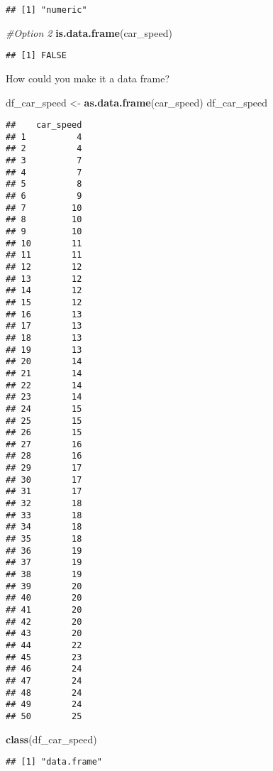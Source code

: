 \documentclass[
]{article}
\newenvironment{Shaded}{\begin{snugshade}}{\end{snugshade}}
\newcommand{\CommentTok}[1]{\textcolor[rgb]{0.56,0.35,0.01}{\textit{#1}}}
\newcommand{\KeywordTok}[1]{\textcolor[rgb]{0.13,0.29,0.53}{\textbf{#1}}}
\newcommand{\NormalTok}[1]{#1}
\newcommand{\StringTok}[1]{\textcolor[rgb]{0.31,0.60,0.02}{#1}}
\begin{document}
\begin{verbatim}
## [1] "numeric"
\end{verbatim}

\begin{Shaded}
\begin{Highlighting}[]
\CommentTok{#Option 2}
\KeywordTok{is.data.frame}\NormalTok{(car_speed)}
\end{Highlighting}
\end{Shaded}

\begin{verbatim}
## [1] FALSE
\end{verbatim}

How could you make it a data frame?

\begin{Shaded}
\begin{Highlighting}[]
\NormalTok{df_car_speed <-}\StringTok{ }\KeywordTok{as.data.frame}\NormalTok{(car_speed)}
\NormalTok{df_car_speed}
\end{Highlighting}
\end{Shaded}

\begin{verbatim}
##    car_speed
## 1          4
## 2          4
## 3          7
## 4          7
## 5          8
## 6          9
## 7         10
## 8         10
## 9         10
## 10        11
## 11        11
## 12        12
## 13        12
## 14        12
## 15        12
## 16        13
## 17        13
## 18        13
## 19        13
## 20        14
## 21        14
## 22        14
## 23        14
## 24        15
## 25        15
## 26        15
## 27        16
## 28        16
## 29        17
## 30        17
## 31        17
## 32        18
## 33        18
## 34        18
## 35        18
## 36        19
## 37        19
## 38        19
## 39        20
## 40        20
## 41        20
## 42        20
## 43        20
## 44        22
## 45        23
## 46        24
## 47        24
## 48        24
## 49        24
## 50        25
\end{verbatim}

\begin{Shaded}
\begin{Highlighting}[]
\KeywordTok{class}\NormalTok{(df_car_speed)}
\end{Highlighting}
\end{Shaded}

\begin{verbatim}
## [1] "data.frame"
\end{verbatim}
\end{document}
